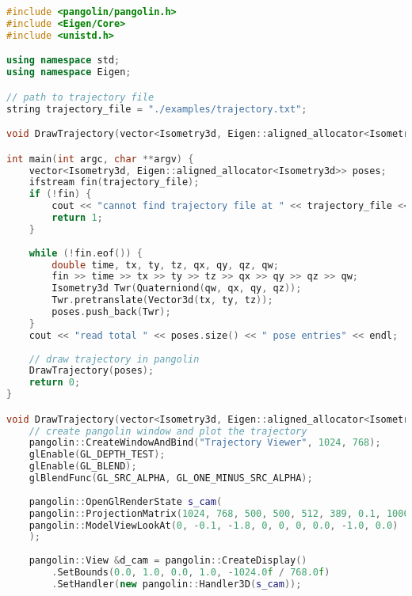\begin{lstlisting}[language=c++,caption=slambook2/ch3/examples/plotTrajectory.cpp]
#include <pangolin/pangolin.h>
#include <Eigen/Core>
#include <unistd.h>

using namespace std;
using namespace Eigen;

// path to trajectory file
string trajectory_file = "./examples/trajectory.txt";

void DrawTrajectory(vector<Isometry3d, Eigen::aligned_allocator<Isometry3d>>);

int main(int argc, char **argv) {
    vector<Isometry3d, Eigen::aligned_allocator<Isometry3d>> poses;
    ifstream fin(trajectory_file);
    if (!fin) {
        cout << "cannot find trajectory file at " << trajectory_file << endl;
        return 1;
    }
    
    while (!fin.eof()) {
        double time, tx, ty, tz, qx, qy, qz, qw;
        fin >> time >> tx >> ty >> tz >> qx >> qy >> qz >> qw;
        Isometry3d Twr(Quaterniond(qw, qx, qy, qz));
        Twr.pretranslate(Vector3d(tx, ty, tz));
        poses.push_back(Twr);
    }
    cout << "read total " << poses.size() << " pose entries" << endl;
    
    // draw trajectory in pangolin
    DrawTrajectory(poses);
    return 0;
}

void DrawTrajectory(vector<Isometry3d, Eigen::aligned_allocator<Isometry3d>> poses) {
    // create pangolin window and plot the trajectory
    pangolin::CreateWindowAndBind("Trajectory Viewer", 1024, 768);
    glEnable(GL_DEPTH_TEST);
    glEnable(GL_BLEND);
    glBlendFunc(GL_SRC_ALPHA, GL_ONE_MINUS_SRC_ALPHA);
    
    pangolin::OpenGlRenderState s_cam(
    pangolin::ProjectionMatrix(1024, 768, 500, 500, 512, 389, 0.1, 1000),
    pangolin::ModelViewLookAt(0, -0.1, -1.8, 0, 0, 0, 0.0, -1.0, 0.0)
    );
    
    pangolin::View &d_cam = pangolin::CreateDisplay()
        .SetBounds(0.0, 1.0, 0.0, 1.0, -1024.0f / 768.0f)
        .SetHandler(new pangolin::Handler3D(s_cam));
    

\end{lstlisting}
